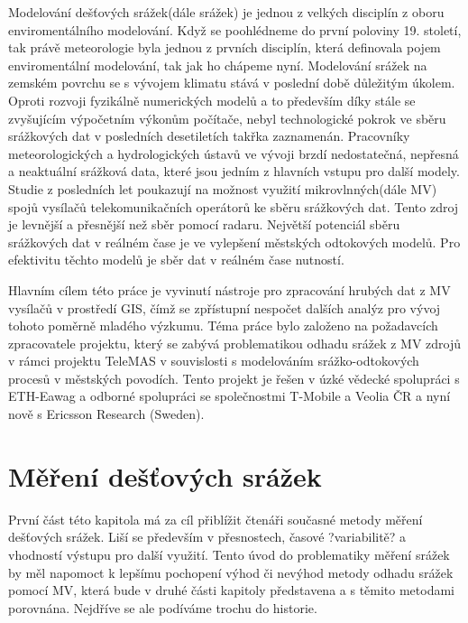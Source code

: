 \documentclass[a4paper,12pt]{article}
\begin{document}
Modelování dešťových srážek(dále srážek) je jednou z velkých disciplín z oboru enviromentálního modelování. Když se poohlédneme do první poloviny 19. století, tak právě meteorologie byla jednou z prvních disciplín, která definovala pojem enviromentální modelování, tak jak ho chápeme nyní. Modelování srážek na zemském povrchu se s vývojem klimatu stává v poslední době důležitým úkolem. Oproti rozvoji fyzikálně numerických modelů a to především díky stále se zvyšujícím výpočetním výkonům počítače, nebyl technologické pokrok ve sběru srážkových dat v posledních desetiletích takřka zaznamenán. Pracovníky meteorologických a hydrologických ústavů ve vývoji brzdí nedostatečná, nepřesná a neaktuální srážková data, které jsou jedním z hlavních vstupu pro další modely. Studie z posledních let poukazují na možnost využití mikrovlnných(dále MV) spojů vysílačů telekomunikačních operátorů ke sběru srážkových dat. Tento zdroj je levnější a přesnější než sběr pomocí radaru.\cite{radar_meterology} Největší potenciál sběru srážkových dat v reálném čase je ve vylepšení městských odtokových modelů. Pro efektivitu těchto modelů je sběr dat v reálném čase nutností.

Hlavním cílem této práce je vyvinutí nástroje pro zpracování hrubých dat z MV vysílačů v prostředí GIS, čímž se zpřístupní nespočet dalších analýz pro vývoj tohoto poměrně mladého výzkumu. Téma práce bylo založeno na požadavcích zpracovatele projektu, který se zabývá problematikou odhadu srážek z MV zdrojů v rámci projektu TeleMAS v souvislosti s modelováním srážko-odtokových procesů v městských povodích. Tento projekt je řešen v úzké vědecké spolupráci s ETH-Eawag a odborné spolupráci se společnostmi T-Mobile a Veolia ČR a nyní nově s Ericsson Research (Sweden).  

 




\newpage
\section{Měření dešťových srážek}
První část této kapitola má za cíl přiblížit čtenáři současné metody měření dešťových srážek. Liší se především v přesnostech, časové ?variabilitě? a vhodností výstupu pro další využití. Tento úvod do problematiky měření srážek by měl napomoct k lepšímu pochopení výhod či nevýhod metody odhadu srážek pomocí MV, která bude v druhé části kapitoly představena a s těmito metodami porovnána. Nejdříve se ale podíváme trochu do historie.
\end{document}

